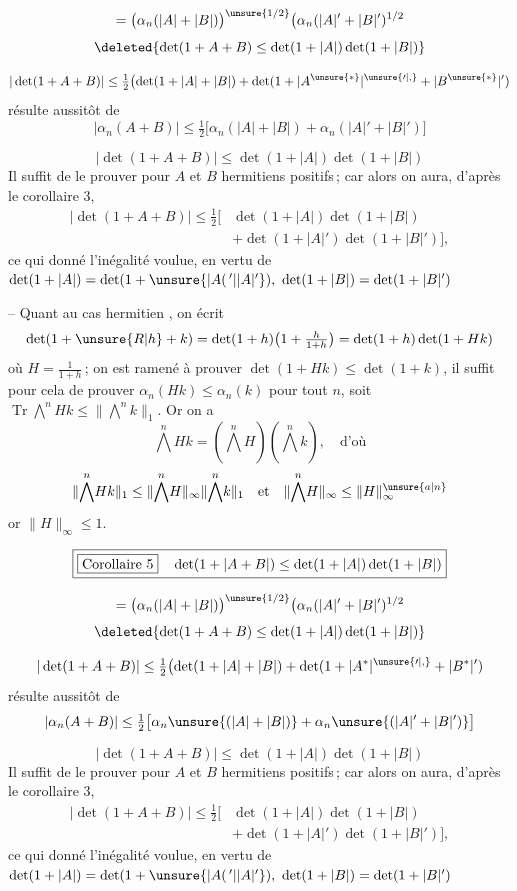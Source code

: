 
\[
=\bigl(\alpha_n(|A|+|B|)\bigr)^{\unsure{1/2}}\bigl(\alpha_n(|A|'+|B|')^{1/2}
\]
\[
\deleted{\det(1+A+B)\leq\det(1+|A|)\det(1+|B|)}
\]

\[
|\det(1+A+B)|\leq\tfrac12\bigl(\det(1+|A|+|B|)+\det(1+|A^{\unsure{*}}|^{\unsure{\prime|,}}+|B^{\unsure{*}}|')
\]
résulte aussitôt de
\[
|\alpha_n(A+B)|\leq\tfrac12\bigl[\alpha_n(|A|+|B|)+\alpha_n(|A|'+|B|')\bigr]
\]

\[
\boxed{|\det(1+A+B)|\leq\det(1+|A|)\det(1+|B|)}
\]
Il suffit de  le prouver pour $A$ et $B$
hermitiens positifs\,; car alors on aura, d'après
le corollaire 3,
\[
\begin{aligned}
|\det(1+A+B)|\leq\tfrac12\bigl[&\det(1+|A|)\det(1+|B|)\\
&+\det(1+|A|')\det(1+|B|')\bigr],
\end{aligned}
\]
ce qui donné l'inégalité voulue, en vertu de
$\det(1+|A|)=\det(1+\unsure{\lvert A(\,{}'|\lvert A\rvert'}),\ \det(1+|B|)=\det(1+|B|')$

-- Quant au cas hermitien , on écrit
\[
\det(1+\unsure{R|h}+k)=\det(1+h)\bigl(1+\tfrac{h}{1+h}\bigr)=\det(1+h)\det(1+Hk)
\]
où $H=\frac{1}{1+h}$\,; on est ramené à prouver
$\det(1+Hk)\leq\det(1+k)$, il suffit pour cela
de prouver $\alpha_n(Hk)\leq\alpha_n(k)$ pour tout $n$,
soit $\operatorname{Tr}\overset{n}{\bigwedge}Hk\leq\|\overset{n}{\bigwedge}k\|_1$. Or on a
\[
\overset{n}{\bigwedge}Hk=(\overset{n}{\bigwedge}H)(\overset{n}{\bigwedge}k),\quad\text{d'où}
\]
\[
\|\overset{n}{\bigwedge}Hk\|_1\leq\|\overset{n}{\bigwedge}H\|_\infty\|\overset{n}{\bigwedge}k\|_1
\quad\text{et}\quad\|\overset{n}{\bigwedge}H\|_\infty\leq\|H\|_\infty^{\unsure{a|n}}
\]
\margin{!}or $\|H\|_\infty\leq1$.

\[
\boxed{\text{\fbox{Corollaire 5}}\quad\det(1+|A+B|)\leq\det(1+|A|)\det(1+|B|)}
\]

\[
=\bigl(\alpha_n(|A|+|B|)\bigr)^{\unsure{1/2}}\bigl(\alpha_n(|A|'+|B|')^{1/2}
\]
\[
\deleted{\det(1+A+B)\leq\det(1+|A|)\det(1+|B|)}
\]

\[
|\det(1+A+B)|\leq\tfrac12\bigl(\det(1+|A|+|B|)+\det(1+|A^*|^{\unsure{\prime|,}}+|B^*|')\bigr.
\]
résulte aussitôt de
\[
|\alpha_n(A+B)|\leq\tfrac12\bigl[\alpha_n\unsure{(|A|+|B|)}+\alpha_n\unsure{(|A|'+|B|')}\bigr]
\]

\[
\boxed{|\det(1+A+B)|\leq\det(1+|A|)\det(1+|B|)}
\]
Il suffit de  le prouver pour $A$ et $B$
hermitiens positifs\,; car alors on aura, d'après
le corollaire 3,
\[
\begin{aligned}
|\det(1+A+B)|\leq\tfrac12\bigl[&\det(1+|A|)\det(1+|B|)\\
&+\det(1+|A|')\det(1+|B|')\bigr],
\end{aligned}
\]
ce qui donné l'inégalité voulue, en vertu de
$\det(1+|A|)=\det(1+\unsure{\lvert A(\,{}'|\lvert A\rvert'}),\ \det(1+|B|)=\det(1+|B|')$

